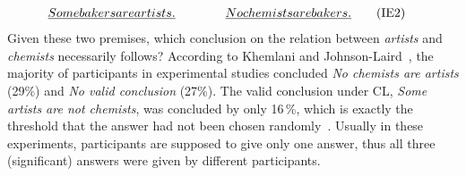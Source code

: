 \documentclass[12pt]{article}
\begin{document}
\begin{align}
 \emph{Some bakers are artists. }\quad\quad  \quad\quad & \emph{No chemists are bakers.} \tag{IE2} 
\end{align}
Given these
two premises, which conclusion on the relation between \emph{artists} and \emph{chemists} necessarily follows?
According to Khemlani and Johnson-Laird~\cite{khemlani:2012}, the majority of participants in experimental studies
concluded \emph{No chemists are artists} (29\;\%) and \emph{No valid conclusion} (27\;\%).
The valid conclusion under CL, \emph{Some artists are not chemists},
was concluded by only 16\,\%, which is exactly the threshold that the answer had not been chosen randomly~\cite{khemlani:2012}.
Usually in these experiments, participants are supposed to give only one answer, thus all three (significant) answers
were given by different participants. 
\end{document}
